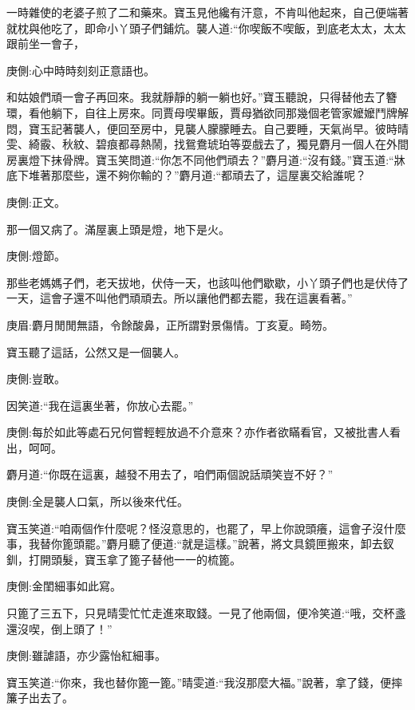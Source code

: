\begin{parag}
    一時雜使的老婆子煎了二和藥來。寶玉見他纔有汗意，不肯叫他起來，自己便端著就枕與他吃了，即命小丫頭子們鋪炕。襲人道:“你喫飯不喫飯，到底老太太，太太跟前坐一會子，\begin{note}庚側:心中時時刻刻正意語也。\end{note}和姑娘們頑一會子再回來。我就靜靜的躺一躺也好。”寶玉聽說，只得替他去了簪環，看他躺下，自往上房來。同賈母喫畢飯，賈母猶欲同那幾個老管家嬤嬤鬥牌解悶，寶玉記著襲人，便回至房中，見襲人朦朦睡去。自己要睡，天氣尚早。彼時晴雯、綺霰、秋紋、碧痕都尋熱鬧，找鴛鴦琥珀等耍戲去了，獨見麝月一個人在外間房裏燈下抹骨牌。寶玉笑問道:“你怎不同他們頑去？”麝月道:“沒有錢。”寶玉道:“牀底下堆著那麼些，還不夠你輸的？”麝月道:“都頑去了，這屋裏交給誰呢？\begin{note}庚側:正文。\end{note}那一個又病了。滿屋裏上頭是燈，地下是火。\begin{note}庚側:燈節。\end{note}那些老媽媽子們，老天拔地，伏侍一天，也該叫他們歇歇，小丫頭子們也是伏侍了一天，這會子還不叫他們頑頑去。所以讓他們都去罷，我在這裏看著。”\begin{note}庚眉:麝月閒閒無語，令餘酸鼻，正所謂對景傷情。丁亥夏。畸笏。\end{note}
\end{parag}


\begin{parag}
    寶玉聽了這話，公然又是一個襲人。\begin{note}庚側:豈敢。\end{note}因笑道:“我在這裏坐著，你放心去罷。”\begin{note}庚側:每於如此等處石兄何嘗輕輕放過不介意來？亦作者欲瞞看官，又被批書人看出，呵呵。\end{note}麝月道:“你既在這裏，越發不用去了，咱們兩個說話頑笑豈不好？”\begin{note}庚側:全是襲人口氣，所以後來代任。\end{note}寶玉笑道:“咱兩個作什麼呢？怪沒意思的，也罷了，早上你說頭癢，這會子沒什麼事，我替你篦頭罷。”麝月聽了便道:“就是這樣。”說著，將文具鏡匣搬來，卸去釵釧，打開頭髮，寶玉拿了篦子替他一一的梳篦。\begin{note}庚側:金閨細事如此寫。\end{note}只篦了三五下，只見晴雯忙忙走進來取錢。一見了他兩個，便冷笑道:“哦，交杯盞還沒喫，倒上頭了！”\begin{note}庚側:雖謔語，亦少露怡紅細事。\end{note}寶玉笑道:“你來，我也替你篦一篦。”晴雯道:“我沒那麼大福。”說著，拿了錢，便摔簾子出去了。
\end{parag}


